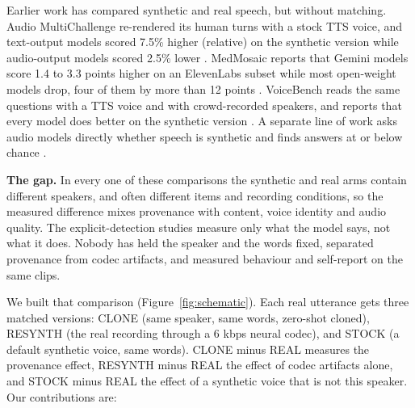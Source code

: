 Earlier work has compared synthetic and real speech, but without matching. Audio MultiChallenge re-rendered its human turns with a stock TTS voice, and text-output models scored 7.5\% higher (relative) on the synthetic version while audio-output models scored 2.5\% lower \citep{a2512_14865}. MedMosaic reports that Gemini models score 1.4 to 3.3 points higher on an ElevenLabs subset while most open-weight models drop, four of them by more than 12 points \citep{a2605_00969}. VoiceBench reads the same questions with a TTS voice and with crowd-recorded speakers, and reports that every model does better on the synthetic version \citep{a2410_17196}. A separate line of work asks audio models directly whether speech is synthetic and finds answers at or below chance \citep{a2505_11079,a2512_10652}.

\textbf{The gap.} In every one of these comparisons the synthetic and real arms contain different speakers, and often different items and recording conditions, so the measured difference mixes provenance with content, voice identity and audio quality. The explicit-detection studies measure only what the model says, not what it does. Nobody has held the speaker and the words fixed, separated provenance from codec artifacts, and measured behaviour and self-report on the same clips.

We built that comparison (Figure~\ref{fig:schematic}). Each real utterance gets three matched versions: CLONE (same speaker, same words, zero-shot cloned), RESYNTH (the real recording through a 6 kbps neural codec), and STOCK (a default synthetic voice, same words). CLONE minus REAL measures the provenance effect, RESYNTH minus REAL the effect of codec artifacts alone, and STOCK minus REAL the effect of a synthetic voice that is not this speaker. Our contributions are:

